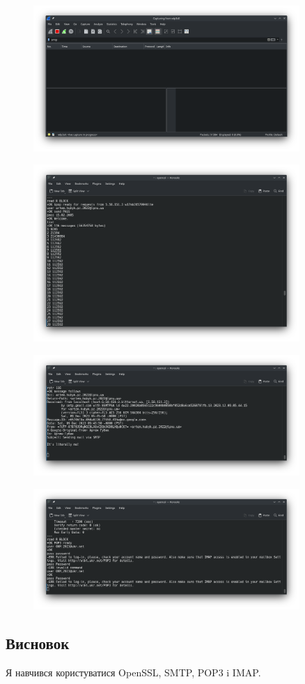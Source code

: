 \documentclass[12pt]{extarticle}
\begin{document}
\begin{figure}[H]
    \centering
    \includegraphics[width=0.90\textwidth]{Screenshot_20231209_162511}
    \caption{}
\end{figure}

\begin{figure}[H]
    \centering
    \includegraphics[width=0.90\textwidth]{pop3}
    \caption{}
\end{figure}
\begin{figure}[H]
    \centering
    \includegraphics[width=0.90\textwidth]{pop32}
    \caption{}
\end{figure}
\begin{figure}[H]
    \centering
    \includegraphics[width=0.90\textwidth]{fail}
    \caption{}
\end{figure}


\subsection*{Висновок} 
Я навчився користуватися OpenSSL, SMTP, POP3 i IMAP. 
\end{document}
